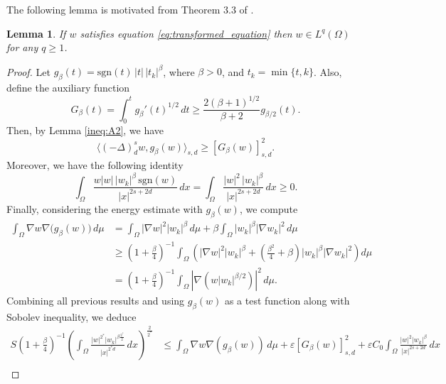 \documentclass[11pt]{article}
\newtheorem{lemma}{Lemma}[section] %
\newcommand{\om} {\Omega}
\begin{document}
The following lemma is motivated from Theorem $3.3$ of \cite{squassina_regularity}.
\begin{lemma}\label{lem:moser_iter_lem2}
If $w$ satisfies equation \eqref{eq:transformed_equation} then $w \in L^q(\om)$ for any $q \geq 1$.    
\end{lemma}
\begin{proof}
Let $g_\beta(t) = \text{sgn}(t)\,|t|\,|t_k|^\beta$, where $\beta > 0$,  and $t_k = \min\{t, k\}$. Also, define the auxiliary function
\begin{equation*}
G_\beta(t) = \int_0^t g_\beta'(t)^{1/2} \, dt \geq \frac{2(\beta + 1)^{1/2}}{\beta + 2} g_{\beta/2}(t).
\end{equation*}
Then, by Lemma \ref{ineq:A2}, we have
\begin{equation*}
\langle (-\Delta)^s_d w, g_\beta(w) \rangle_{s,d} \geq \left[ G_\beta(w) \right]_{s,d}^2.
\end{equation*}
Moreover, we have the following identity
\begin{equation*}
\int_\Omega \frac{w |w|\, |w_k|^\beta \, \text{sgn}(w)}{|x|^{2s + 2 d}}\, dx = \int_\Omega \frac{|w|^2\, |w_k|^\beta}{|x|^{2s + 2 d}}\, dx \geq 0.
\end{equation*}
Finally, considering the energy estimate with \( g_\beta(w) \), we compute
\begin{equation*}
\begin{aligned}
\int_\Omega \nabla w  \nabla \big( g_\beta(w) \big)\, d\mu 
&= \int_\Omega |\nabla w|^2 |w_k|^\beta\, d\mu + \beta \int_\Omega |w_k|^\beta |\nabla w_k|^2 \, d\mu \\
&\geq \left(1 + \frac{\beta}{4}\right)^{-1} \int_\Omega \left( |\nabla w|^2 |w_k|^\beta + \left( \frac{\beta^2}{4} + \beta \right) |w_k|^\beta |\nabla w_k|^2 \right) d\mu \\
&= \left(1 + \frac{\beta}{4} \right)^{-1} \int_\Omega |\nabla (w |w_k|^{\beta/2})|^2\, d\mu.
\end{aligned}
\end{equation*}
Combining all previous results and using \( g_\beta(w) \) as a test function along with Sobolev inequality, we deduce
\begin{equation}\label{eq:moser_estimate1}
\begin{aligned}
S \left( 1 + \frac{\beta}{4} \right)^{-1}
\left( \int_\Omega \frac{|w|^{2^*} |w_k|^{\beta \frac{2^*}{2}}}{|x|^{2^* d}} \, dx \right)^{\frac{2}{2^*}}
&\leq \int_\Omega \nabla w  \nabla (g_\beta(w)) \, d\mu + \varepsilon \left[ G_\beta(w) \right]_{s,d}^2 + \varepsilon C_0\int_\Omega \frac{|w|^2 |w_k|^\beta}{|x|^{2s + 2 d}}\, dx \\

\end{aligned}
\end{equation}
\end{proof}
\end{document}
